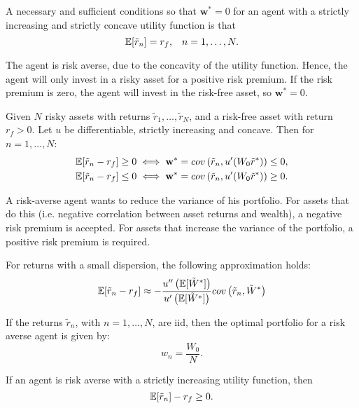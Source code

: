 \documentclass[twoside, titlepage]{article}
\begin{document}
\begin{proposition}
 A necessary and sufficient conditions so that $\mathbf{w}^* = 0$ for an agent with a strictly increasing and strictly concave utility function is that
\[
    \mathbb{E}[\tilde{r}_n]  = r_f, \;\;\; n = 1, \dots, N.
\]
\begin{explanation}
    The agent is risk averse, due to the concavity of the utility function. Hence, the agent will only invest in a risky asset for a positive risk premium. If the risk premium is zero, the agent will invest in the risk-free asset, so $\mathbf{w}^* = 0$.
\end{explanation}
\end{proposition}

\begin{proposition}
    Given $N$ risky assets with returns $\tilde{r}_1, \dots, \tilde{r}_N$, and a risk-free asset with return $r_f > 0$. Let $u$ be differentiable, strictly increasing and concave. Then for $n = 1, \dots, N$:
    \begin{align*}
        \mathbb{E}[\tilde{r}_n - r_f] &\geq 0 \iff \mathbf{w}^* = cov\left(\tilde{r}_n, u'(W_0\tilde{r}^*)\right) \leq 0, \\
        \mathbb{E}[\tilde{r}_n - r_f] &\leq 0 \iff \mathbf{w}^* = cov\left(\tilde{r}_n, u'(W_0\tilde{r}^*)\right) \geq 0.
    \end{align*}
    \begin{explanation}
        A risk-averse agent wants to reduce the variance of his portfolio. For assets that do this (i.e. negative correlation between asset returns and wealth), a negative risk premium is accepted. For assets that increase the variance of the portfolio, a positive risk premium is required.
    \end{explanation}
\end{proposition}

For returns with a small dispersion, the following approximation holds:
\[
    \mathbb{E}[\tilde{r}_n - r_f] \approx - \frac{u''\left(\mathbb{E}[\tilde{W}^*]\right)}{u'\left(\mathbb{E}[\tilde{W}^*]\right)} cov\left(\tilde{r}_n, \tilde{W}^*\right)
\]


\begin{proposition}
    If the returns $\tilde{r}_n$, with $n = 1, \dots, N$, are iid, then the optimal portfolio for a risk averse agent is given by:
    \[
        w_n = \frac{W_0}{N}.
    \]
\end{proposition}

\begin{proposition}
    If an agent is risk averse with a strictly increasing utility function, then
    \[
        \mathbb{E}[\tilde{r}_n] - r_f \geq 0.
    \]
\end{proposition}
\end{document}
